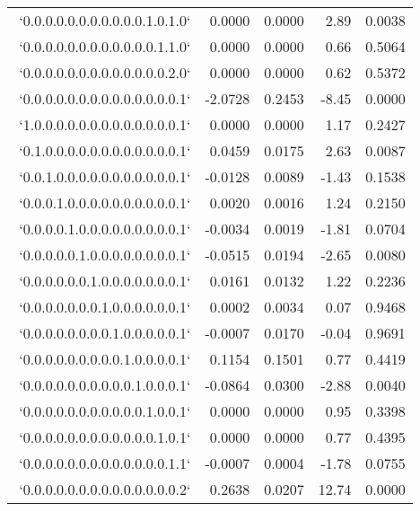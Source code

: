 \begin{table}[ht]
\begin{tabular}{rrrrr}
$$  `0.0.0.0.0.0.0.0.0.0.0.1.0.1.0` & 0.0000 & 0.0000 & 2.89 & 0.0038 \\ 
  `0.0.0.0.0.0.0.0.0.0.0.0.1.1.0` & 0.0000 & 0.0000 & 0.66 & 0.5064 \\ 
  `0.0.0.0.0.0.0.0.0.0.0.0.0.2.0` & 0.0000 & 0.0000 & 0.62 & 0.5372 \\ 
  `0.0.0.0.0.0.0.0.0.0.0.0.0.0.1` & -2.0728 & 0.2453 & -8.45 & 0.0000 \\ 
  `1.0.0.0.0.0.0.0.0.0.0.0.0.0.1` & 0.0000 & 0.0000 & 1.17 & 0.2427 \\ 
  `0.1.0.0.0.0.0.0.0.0.0.0.0.0.1` & 0.0459 & 0.0175 & 2.63 & 0.0087 \\ 
  `0.0.1.0.0.0.0.0.0.0.0.0.0.0.1` & -0.0128 & 0.0089 & -1.43 & 0.1538 \\ 
  `0.0.0.1.0.0.0.0.0.0.0.0.0.0.1` & 0.0020 & 0.0016 & 1.24 & 0.2150 \\ 
  `0.0.0.0.1.0.0.0.0.0.0.0.0.0.1` & -0.0034 & 0.0019 & -1.81 & 0.0704 \\ 
  `0.0.0.0.0.1.0.0.0.0.0.0.0.0.1` & -0.0515 & 0.0194 & -2.65 & 0.0080 \\ 
  `0.0.0.0.0.0.1.0.0.0.0.0.0.0.1` & 0.0161 & 0.0132 & 1.22 & 0.2236 \\ 
  `0.0.0.0.0.0.0.1.0.0.0.0.0.0.1` & 0.0002 & 0.0034 & 0.07 & 0.9468 \\ 
  `0.0.0.0.0.0.0.0.1.0.0.0.0.0.1` & -0.0007 & 0.0170 & -0.04 & 0.9691 \\ 
  `0.0.0.0.0.0.0.0.0.1.0.0.0.0.1` & 0.1154 & 0.1501 & 0.77 & 0.4419 \\ 
  `0.0.0.0.0.0.0.0.0.0.1.0.0.0.1` & -0.0864 & 0.0300 & -2.88 & 0.0040 \\ 
  `0.0.0.0.0.0.0.0.0.0.0.1.0.0.1` & 0.0000 & 0.0000 & 0.95 & 0.3398 \\ 
  `0.0.0.0.0.0.0.0.0.0.0.0.1.0.1` & 0.0000 & 0.0000 & 0.77 & 0.4395 \\ 
  `0.0.0.0.0.0.0.0.0.0.0.0.0.1.1` & -0.0007 & 0.0004 & -1.78 & 0.0755 \\ 
  `0.0.0.0.0.0.0.0.0.0.0.0.0.0.2` & 0.2638 & 0.0207 & 12.74 & 0.0000 \\ 
   \hline
\end{tabular}
\end{table}
